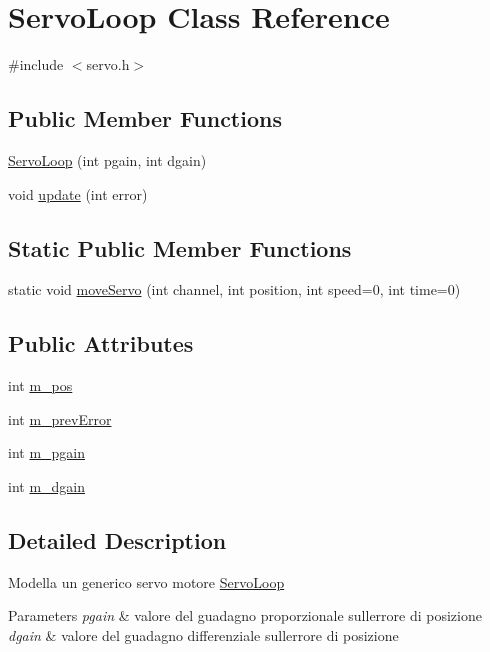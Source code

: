 \hypertarget{class_servo_loop}{}\section{Servo\+Loop Class Reference}
\label{class_servo_loop}


{\ttfamily \#include $<$servo.\+h$>$}

\subsection*{Public Member Functions}
\begin{DoxyCompactItemize}
\item 
\mbox{\hyperlink{class_servo_loop_ac8638cbe2711a19e66747a4382d68e6a}{Servo\+Loop}} (int pgain, int dgain)
\item 
void \mbox{\hyperlink{class_servo_loop_af79e31631439df5f5cc4746dca6e50d9}{update}} (int error)
\end{DoxyCompactItemize}
\subsection*{Static Public Member Functions}
\begin{DoxyCompactItemize}
\item 
static void \mbox{\hyperlink{class_servo_loop_adfbfae169a73a548ca3963c9099998d9}{move\+Servo}} (int channel, int position, int speed=0, int time=0)
\end{DoxyCompactItemize}
\subsection*{Public Attributes}
\begin{DoxyCompactItemize}
\item 
int \mbox{\hyperlink{class_servo_loop_ad740330c60ab6aa9b089414578862845}{m\+\_\+pos}}
\item 
int \mbox{\hyperlink{class_servo_loop_ac7999e3741b4ede946a41f512002ca92}{m\+\_\+prev\+Error}}
\item 
int \mbox{\hyperlink{class_servo_loop_a71e1790cb21e702d4b9be75085c684aa}{m\+\_\+pgain}}
\item 
int \mbox{\hyperlink{class_servo_loop_a6268eda0c0cf2f24700c29e24318f319}{m\+\_\+dgain}}
\end{DoxyCompactItemize}


\subsection{Detailed Description}
Modella un generico servo motore  \mbox{\hyperlink{class_servo_loop}{Servo\+Loop}} 
\begin{DoxyParams}{Parameters}
{\em pgain} & valore del guadagno proporzionale sull\textquotesingle{}errore di posizione \\
\hline
{\em dgain} & valore del guadagno differenziale sull\textquotesingle{}errore di posizione \\
\hline
\end{DoxyParams}



